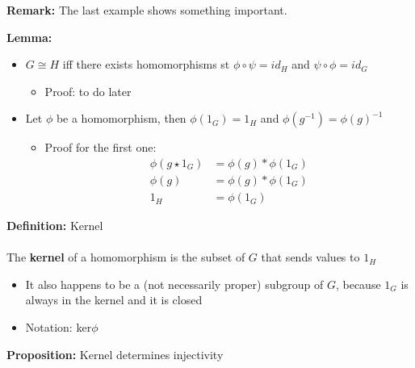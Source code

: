 \documentclass{article}
\begin{document}
\begin{remark} 
\textbf{Remark:} The last example shows something important.
\end{remark}
\begin{lemma} 
\textbf{Lemma:}
\begin{itemize}
	\item $G\cong H$ iff there exists homomorphisms st $\phi \circ \psi = id_H$ and $\psi \circ \phi = id_G$
	\begin{itemize}
		\item Proof: to do later
	\end{itemize}
        \item Let $\phi$ be a homomorphism, then $\phi(1_G)=1_H$ and $\phi(g^{-1})=\phi(g)^{-1}$
	\begin{itemize}
		\item Proof for the first one: 
			\begin{align}
				\phi(g\star 1_G) &= \phi(g)*\phi(1_G) \\
				\phi(g) &= \phi(g)*\phi(1_G) \\
				1_H &= \phi(1_G)
			\end{align}
	\end{itemize}
\end{itemize}
\end{lemma}
\begin{definition} 
\textbf{Definition:} Kernel \\
~\\
The {\color{blue} \textbf{kernel}} of a homomorphism is the subset of $G$ that sends values to $1_H$
\begin{itemize}
	\item It also happens to be a (not necessarily proper) subgroup of $G$, because $1_G$ is always in the kernel and it is closed
	\item Notation: ker$\phi$
\end{itemize}
\end{definition}
\begin{prop} 
\textbf{Proposition:} Kernel determines injectivity
\end{prop}
\end{document}
